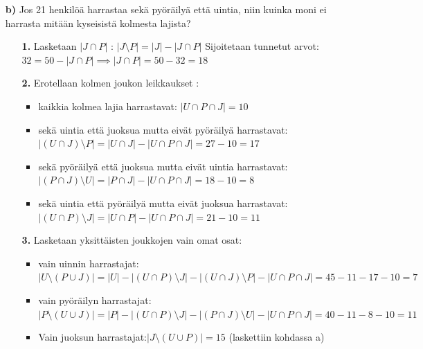 \documentclass{article}
\begin{document}
\begin{itemize}
    \item[\textbf{b)}] Jos 21 henkilöä harrastaa sekä pyöräilyä että uintia, niin kuinka moni ei harrasta mitään kyseisistä kolmesta lajista?
    \begin{itemize}
        \item[\textbf{1.}] Lasketaan $|J \cap P|$ :\newline
        $|J \setminus P| = |J| - |J \cap P|$\newline
        Sijoitetaan tunnetut arvot: $32 = 50 - |J \cap P|$\newline  $\implies |J \cap P| = 50 - 32 = 18$
        \item[\textbf{2.}] Erotellaan kolmen joukon leikkaukset :
        \begin{itemize}
            \item kaikkia kolmea lajia harrastavat: $|U \cap P \cap J| = 10$
            \item sekä uintia että juoksua mutta eivät pyöräilyä harrastavat:\newline $|(U \cap J) \setminus P| = |U \cap J| - |U \cap P \cap J| = 27 - 10 = 17$
            \item sekä pyöräilyä että juoksua mutta eivät uintia harrastavat:\newline $|(P \cap J) \setminus U| = |P \cap J| - |U \cap P \cap J| = 18 - 10 = 8$
            \item sekä uintia että pyöräilyä mutta eivät juoksua harrastavat:\newline $|(U \cap P) \setminus J| = |U \cap P| - |U \cap P \cap J| = 21 - 10 = 11$
        \end{itemize}
        \item[\textbf{3.}] Lasketaan yksittäisten joukkojen vain omat osat:
        \begin{itemize}
            \item vain uinnin harrastajat:\newline $|U \setminus (P \cup J)| = |U| - |(U \cap P) \setminus J| - |(U \cap J) \setminus P| - |U \cap P \cap J| = 45 - 11 - 17 - 10 = 7$
            \item vain pyöräilyn harrastajat:\newline $|P \setminus (U \cup J)| = |P| - |(U \cap P) \setminus J| - |(P \cap J) \setminus U| - |U \cap P \cap J| = 40 - 11 - 8 - 10 = 11$
            \item Vain juoksun harrastajat:\newline$|J \setminus (U \cup P)| = 15$ (laskettiin kohdassa a)
        \end{itemize}

\end{itemize}
\end{itemize}
\end{document}
